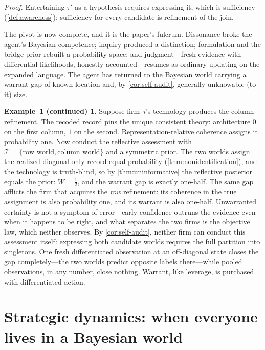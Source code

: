 \documentclass[11pt]{article}
\theoremstyle{definition}
\newtheorem*{excont}{Example~1 (continued)}
\begin{document}
\begin{proof}
Entertaining $\tau'$ as a hypothesis requires expressing it, which is
sufficiency (\cref{def:awareness}); sufficiency for every candidate is
refinement of the join.
\end{proof}

The pivot is now complete, and it is the paper's fulcrum.  Dissonance broke
the agent's Bayesian competence; inquiry produced a distinction; formulation
and the bridge prior rebuilt a probability space; and judgment---fresh
evidence with differential likelihoods, honestly accounted---resumes as
ordinary updating on the expanded language.  The agent has returned to the
Bayesian world carrying a warrant gap of known location and, by
\cref{cor:self-audit}, generally unknowable (to it) size.

\begin{excont}
Suppose firm~$i$'s technology produces the column refinement.  The recoded
record pins the unique consistent theory: architecture $0$ on the first
column, $1$ on the second.  Representation-relative coherence assigns it
probability one.  Now conduct the reflective assessment with
$\mathcal T=\{\text{row world},\text{column world}\}$ and a symmetric prior.
The two worlds assign the realized diagonal-only record equal probability
(\cref{thm:nonidentification}), and the technology is truth-blind, so by
\cref{thm:uninformative} the reflective posterior equals the prior:
$W=\tfrac12$, and the warrant gap is exactly one-half.  The same gap
afflicts the firm that acquires the \emph{row} refinement: its coherence in
the true assignment is also probability one, and its warrant is also
one-half.  Unwarranted certainty is not a symptom of error---early
confidence outruns the evidence even when it happens to be right, and what
separates the two firms is the objective law, which neither observes.  By
\cref{cor:self-audit}, neither firm can conduct this assessment itself:
expressing both candidate worlds requires the full partition into
singletons.  One fresh differentiated observation at an off-diagonal state
closes the gap completely---the two worlds predict opposite labels
there---while pooled observations, in any number, close nothing.  Warrant,
like leverage, is purchased with differentiated action.
\end{excont}
\section{Strategic dynamics: when everyone lives in a Bayesian world}
\label{sec:dynamics}
\end{document}
